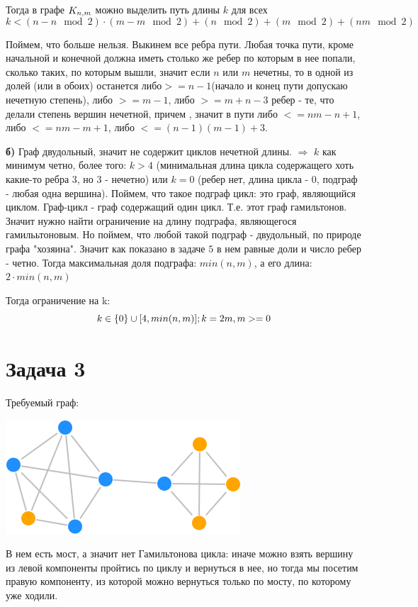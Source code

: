 \documentclass{article}
\begin{document}
Тогда в графе $K_{n,\space m}$ можно выделить путь длины $k$ для всех $$k < (n - n\mod2) \cdot (m - m\mod 2) + (n\mod 2) + (m\mod 2) + (nm\mod 2)$$

Поймем, что больше нельзя. Выкинем все ребра пути. Любая точка пути, кроме начальной и конечной должна иметь столько же ребер по которым в нее попали, сколько таких, по которым вышли, значит если $n$ или $m$ нечетны, то в одной из долей (или в обоих) останется либо$>= n - 1$(начало и конец пути допускаю нечетную степень), либо $>= m - 1$, либо $>= m + n - 3$ ребер - те, что делали степень вершин нечетной, причем , значит в пути либо $<= nm - n + 1$, либо $<= nm - m + 1$, либо $<= (n - 1)(m - 1) + 3$.

\textbf{б)} Граф двудольный, значит не содержит циклов нечетной длины. $\Rightarrow$ $k$ как минимум четно, более того: $k > 4$ (минимальная длина цикла содержащего хоть какие-то ребра 3, но 3 - нечетно) или $k = 0$ (ребер нет, длина цикла - 0, подграф - любая одна вершина). Поймем, что такое подграф цикл: это граф, являющийся циклом. Граф-цикл - граф содержащий один цикл. Т.е. этот граф гамильтонов. Значит нужно найти ограничение на длину подграфа, являющегося гамилььтоновым. Но поймем, что любой такой подграф - двудольный, по природе графа "хозяина". Значит как показано в задаче $5$ в нем равные доли и число ребер - четно. Тогда максимальная доля подграфа: $min(n, m)$, а его длина: $2 \cdot min(n, m)$

Тогда ограничение на k:
$$ k \in \{0\} \cup [4, min(n, m)]; k = 2m,\space m >= 0 $$


\section{Задача 3}

Требуемый граф:
\\
\begin{center}
\includegraphics[scale=0.5]{3_1}
\end{center}

В нем есть мост, а значит нет Гамильтонова цикла: иначе можно взять вершину из левой компоненты пройтись по циклу и вернуться в нее, но тогда мы посетим правую компоненту, из которой можно вернуться только по мосту, по которому уже ходили.
\end{document}
